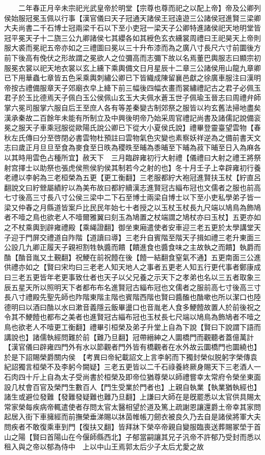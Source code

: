 　　二年春正月辛未宗祀光武皇帝於明堂【宗尊也尊而祀之以配上帝】帝及公卿列侯始服冠冕玉佩以行事【漢官儀曰天子冠通天諸侯王冠遠遊三公諸侯冠進賢三梁卿大夫尚書二千石博士冠兩梁千石以下至小吏冠一梁天子公卿特進諸侯祀天地明堂皆冠平冕天子十二旒三公九卿諸侯七其纓各如其綬色玄衣纁裳周禮曰王祀昊天上帝則服大裘而冕祀五帝亦如之三禮圖曰冕以三十升布漆而為之廣八寸長尺六寸前圜後方前下後高有俛伏之形故謂之冕欲人之位彌高而志彌下故以名焉董巴輿服志曰顯宗初服冕衣裳以祀天地衣裳以玄上纁下乘輿備文日月星辰十二章三公諸侯用山龍九章卿已下用華蟲七章皆五色采乘輿刺繡公卿已下皆織成陳留襄邑獻之徐廣車服注曰漢明帝按古禮備服章天子郊廟衣皁上絳下前三幅後四幅衣畫而裳繡禮記古之君子必佩玉君子於玉比德焉天子佩白玉公侯佩山玄玉大夫佩水蒼玉世子佩瑜玉晉志曰周禮弁師掌六冕司服掌六服自后王至庶人各有等差秦變古制郊祭之服皆以袀玄舊法掃地盡矣漢承秦故二百餘年未能有所制立及中興後明帝乃始采周官禮記尚書及諸儒記說備衮冕之服天子車乘冠服從歐陽氏說公卿已下從大小夏侯氏說】禮畢登靈臺望雲物【春秋左氏傳曰分至啓閉必書雲物杜預註曰雲物氣色灾變也素察妖祥逆為之備前書天文志曰歲正月旦旦至食為麥食至日昳為稷昳至晡為黍晡至下晡為菽下晡至日入為麻各以其時用雲色占種所宜】赦天下　三月臨辟雍初行大射禮【儀禮曰大射之禮王將祭射宫擇士以助祭也張虎侯熊侯豹侯其制若今之射的也】冬十月壬子上幸辟雍初行養老禮以李躬為三老桓榮為五更【更工衡翻】三老服都紵大袍冠進賢扶玉杖【紵直呂翻說文曰紵檾屬績紵以為美布故曰都紵續漢志進賢冠古緇布冠也文儒者之服也前高七寸後高三寸長八寸公侯三梁中二下石至博士兩梁自博士以下至小吏私學弟子皆一梁又仲春之月縣道皆案戶比民民年始七十者授之以玉杖玉杖長九尺端以鳩鳥為飾鳩者不噎之鳥也欲老人不噎爾雅翼曰刻玉為鳩置之杖端謂之鳩杖亦曰玉杖】五更亦如之不杖乘輿到辟雍禮殿【乘䋲證翻】御坐東廂遣使者安車迎三老五更於太學講堂天子迎于門屏交禮道自阼階【道讀曰導】三老升自賓階至階天子揖如禮三老升東面三公設几九卿正履天子親袒割牲執醬而饋【饋進食也醬食味之主故執之而饋】執爵而酳【酳音胤又土覲翻】祝鯁在前祝饐在後【饐一結翻食窒氣不通】五更南面三公進供禮亦如之【賢曰宋均曰三老老人知天地人之事者五更老人知五行更代事者鄭康成曰三老五更皆年老更事致仕者也天子以父兄養之示天下之孝弟也名以三五者取象三辰五星天所以照明天下者都布布名進賢冠古緇布冠也文儒者之服前高七寸後高三寸長八寸禮殿先聖先師也阼階東階主階也賓階西階也賢曰醬醢也酳嗽也所以潔口也陸德明曰以酒曰酳以水曰漱音義隱云飯畢盪口也音胤老人食多鯁饐故置人於前後祝之令其不鯁饐也都布之美者也進賢冠古緇布冠也玉杖長七尺端以鳩鳥為飾鳩者不噎之鳥也欲老人不噎更工衡翻】禮畢引桓榮及弟子升堂上自為下說【賢曰下說謂下語而講說也】諸儒執經問難於前【難乃旦翻】冠帶縉紳之人圜橋門而觀聽者蓋億萬計【漢官儀曰辟雍四門外有水以節觀者門外皆有橋觀者在水外故云圜橋門也圜繞也】於是下詔賜榮爵關内侯　【考異曰帝紀載詔文上言李躬而下獨封榮似脱躬字榮傳袁紀詔獨言桓榮不及李躬今闕疑】三老五更皆以二千石祿養終厥身賜天下三老酒人一石肉四十斤上自為太子受尚書於桓榮及即帝位猶尊榮以師禮嘗幸太常府令榮坐東面設几杖會百官及榮門生數百人【門生受業於門者也】上親自執業【執業猶執經也】諸生或避位發難【發難發疑難也難乃旦翻】上謙曰大師在是旣罷悉以太官供具賜太常家榮每疾病帝輒遣使者存問太官太醫相望於道及篤上疏謝恩讓還爵土帝幸其家問起居入街下車擁經而前撫榮垂涕賜以牀茵帷帳刀劒衣被良久乃去自是諸侯將軍大夫問疾者不敢復乘車到門【復扶又翻】皆拜牀下榮卒帝親自變服臨喪送葬賜冢塋于首山之陽【賢曰首陽山在今偃師縣西北】子郁當嗣讓其兄子汎帝不許郁乃受封而悉以租入與之帝以郁為侍中　上以中山王焉郭太后少子太后尤愛之故